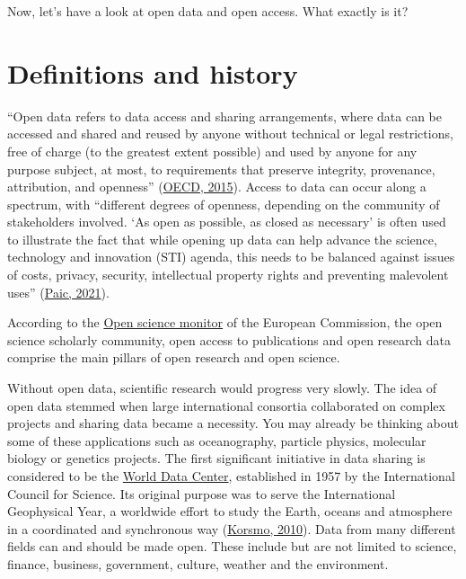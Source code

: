 \documentclass[
]{book}
\begin{document}
Now, let's have a look at open data and open access. What exactly is it?

\hypertarget{definitions-and-history}{%
\section{Definitions and history}\label{definitions-and-history}}

``Open data refers to data access and sharing arrangements, where data can be accessed and shared and reused by anyone without technical or legal restrictions, free of charge (to the greatest extent possible) and used by anyone for any purpose subject, at most, to requirements that preserve integrity, provenance, attribution, and openness'' (\href{https://www.oecd-ilibrary.org/science-and-technology/making-open-science-a-reality_5jrs2f963zs1-en}{OECD, 2015}). Access to data can occur along a spectrum, with ``different degrees of openness, depending on the community of stakeholders involved. `As open as possible, as closed as necessary' is often used to illustrate the fact that while opening up data can help advance the science, technology and innovation (STI) agenda, this needs to be balanced against issues of costs, privacy, security, intellectual property rights and preventing malevolent uses'' (\href{https://goingdigital.oecd.org/data/notes/No13_ToolkitNote_OpenScience.pdf}{Paic, 2021}).

According to the \href{https://ec.europa.eu/info/research-and-innovation/strategy/strategy-2020-2024/our-digital-future/open-science/open-science-monitor_en}{Open science monitor} of the European Commission, the open science scholarly community, open access to publications and open research data comprise the main pillars of open research and open science.

Without open data, scientific research would progress very slowly. The idea of open data stemmed when large international consortia collaborated on complex projects and sharing data became a necessity. You may already be thinking about some of these applications such as oceanography, particle physics, molecular biology or genetics projects. The first significant initiative in data sharing is considered to be the \href{http://wdc.org.ua/}{World Data Center}, established in 1957 by the International Council for Science. Its original purpose was to serve the International Geophysical Year, a worldwide effort to study the Earth, oceans and atmosphere in a coordinated and synchronous way (\href{https://www.researchgate.net/publication/270166513_The_Origins_and_Principles_of_the_World_Data_Center_System}{Korsmo, 2010}). Data from many different fields can and should be made open. These include but are not limited to science, finance, business, government, culture, weather and the environment.
\end{document}

